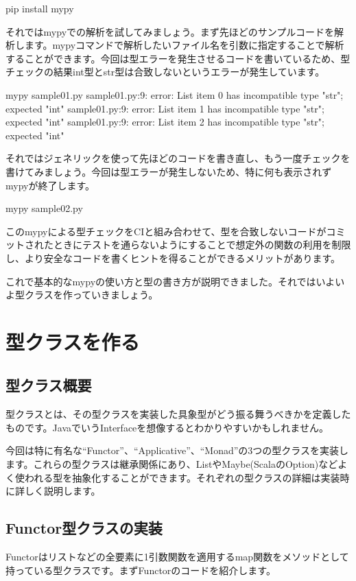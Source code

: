 \begin{bashcode}
pip install mypy
\end{bashcode}

それではmypyでの解析を試してみましょう。まず先ほどのサンプルコードを解析します。mypyコマンドで解析したいファイル名を引数に指定することで解析することができます。今回は型エラーを発生させるコードを書いているため、型チェックの結果int型とstr型は合致しないというエラーが発生しています。

\begin{bashcode}
mypy sample01.py
sample01.py:9: error: List item 0 has incompatible type "str"; expected "int"
sample01.py:9: error: List item 1 has incompatible type "str"; expected "int"
sample01.py:9: error: List item 2 has incompatible type "str"; expected "int"
\end{bashcode}

それではジェネリックを使って先ほどのコードを書き直し、もう一度チェックを書けてみましょう。今回は型エラーが発生しないため、特に何も表示されずmypyが終了します。


\begin{bashcode}
mypy sample02.py
\end{bashcode}

このmypyによる型チェックをCIと組み合わせて、型を合致しないコードがコミットされたときにテストを通らないようにすることで想定外の関数の利用を制限し、より安全なコードを書くヒントを得ることができるメリットがあります。

これで基本的なmypyの使い方と型の書き方が説明できました。それではいよいよ型クラスを作っていきましょう。

\section{型クラスを作る}
\subsection{型クラス概要}
型クラスとは、その型クラスを実装した具象型がどう振る舞うべきかを定義したものです。JavaでいうInterfaceを想像するとわかりやすいかもしれません。

今回は特に有名な``Functor''、``Applicative''、``Monad''の3つの型クラスを実装します。これらの型クラスは継承関係にあり、ListやMaybe(ScalaのOption)などよく使われる型を抽象化することができます。それぞれの型クラスの詳細は実装時に詳しく説明します。

\subsection{Functor型クラスの実装}
Functorはリストなどの全要素に1引数関数を適用するmap関数をメソッドとして持っている型クラスです。まずFunctorのコードを紹介します。

